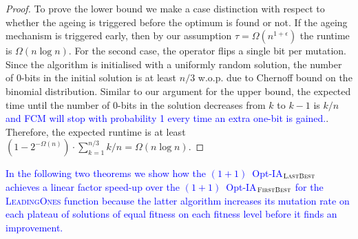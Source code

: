 \documentclass[lettersize,journal]{IEEEtran}
\newcommand{\new}[1]{\textcolor{blue}{#1}}
\begin{document}
\begin{proof}
To prove the lower bound we make a case distinction with respect to whether the ageing is triggered before the optimum is found or not. If the ageing mechanism is triggered early, then by our assumption $\tau=\Omega(n^{1+\epsilon})$ the runtime is $\Omega(n \log n)$. For the second case, the operator flips a single bit per mutation. Since the algorithm is initialised with a uniformly random solution, the number of $0$-bits in the initial solution is at least $n/3$ w.o.p. due to Chernoff bound on the binomial distribution. Similar to our argument for the upper bound, the expected time until the number of $0$-bits in the solution decreases from $k$ to $k-1$ is $k/n$ \new{and FCM will stop with probability 1 every time an extra one-bit is gained.}. Therefore, the expected runtime is  at least $(1-2^{-\Omega(n)}) \cdot \sum_{k=1}^{n/3} k/n = \Omega(n \log n)$. 
\end{proof}

\new{In the following two theorems we show how the $(1+1)$~Opt-IA$_{\textsc{LastBest}}$ achieves a linear factor speed-up over the $(1+1)$~Opt-IA$_{\textsc{FirstBest}}$ for the \textsc{LeadingOnes} function because the latter algorithm increases its mutation rate on each plateau of solutions of equal fitness on each fitness level before it finds an improvement.}
\end{document}
